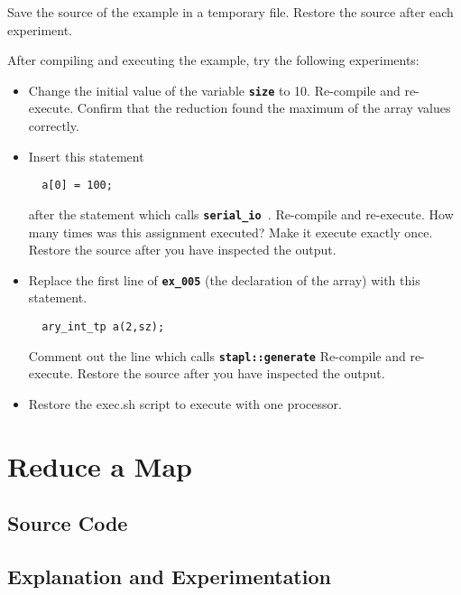 \documentclass{report}
\begin{document}
Save the source of the example in a temporary file.
Restore the source after each experiment.

After compiling and executing the example, try the following experiments:
\begin{itemize}
\item
Change the initial value of the variable
\texttt{{\bf size}}
to 10.
Re-compile and re-execute.  Confirm that the reduction found the maximum
of the array values correctly.
\item
Insert this statement
\begin{verbatim}
  a[0] = 100;
\end{verbatim}
after the statement which calls
\texttt{{\bf serial\_io }}.
Re-compile and re-execute.
How many times was this assignment executed?
Make it execute exactly once.
Restore the source after you have inspected the output.
\item
Replace the first line of
\texttt{{\bf ex\_005}}
(the declaration of the array) with this statement.
\begin{verbatim}
  ary_int_tp a(2,sz);
\end{verbatim}
Comment out the line which calls
\texttt{{\bf stapl::generate}}
Re-compile and re-execute.
Restore the source after you have inspected the output.
\item
Restore the exec.sh script to execute with one processor.
\end{itemize}


\pagebreak
\section{Reduce a Map}

\subsection{Source Code}



\subsection{Explanation and Experimentation}
\end{document}
